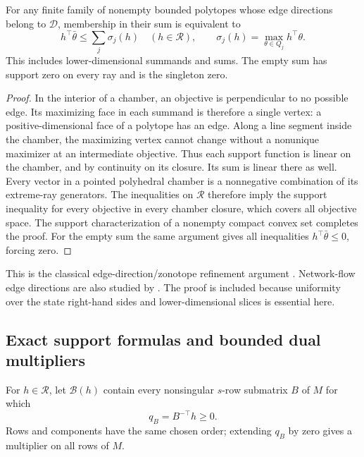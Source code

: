 \begin{lemma}\label{lem:rank-support-library}
For any finite family of nonempty bounded polytopes whose edge directions
belong to $\mathcal D$, membership in their sum is equivalent to
\begin{equation}\label{eq:rank-support-tests}
 h^\top\bar\theta\le\sum_j\sigma_j(h)\quad(h\in\mathcal R),\qquad
 \sigma_j(h)=\max_{\theta\in Q_j}h^\top\theta.
\end{equation}
This includes lower-dimensional summands and sums. The empty sum has
support zero on every ray and is the singleton zero.
\end{lemma}
\begin{proof}
In the interior of a chamber, an objective is perpendicular to no
possible edge. Its maximizing face in each summand is therefore a single
vertex: a positive-dimensional face of a polytope has an edge. Along
a line segment inside the chamber, the maximizing vertex cannot change
without a nonunique maximizer at an intermediate objective. Thus each
support function is linear on the chamber, and by continuity on its
closure. Its sum is linear there as well. Every vector in a pointed
polyhedral chamber is a nonnegative combination of its extreme-ray
generators. The inequalities on $\mathcal R$ therefore imply the support
inequality for every objective in every chamber closure, which covers
all objective space. The support characterization of a nonempty compact
convex set completes the proof. For the empty sum the same argument
gives all inequalities $h^\top\bar\theta\le0$, forcing zero.
\end{proof}

This is the classical edge-direction/zonotope refinement argument
\citep{GritzmannSturmfels1993,OnnRothblum2004,MelamedOnn2014}.
Network-flow edge directions are also studied by
\citet{OnnRothblumTangir2005}. The proof is included because uniformity
over the state right-hand sides and lower-dimensional slices is essential
here.

\subsection{Exact support formulas and bounded dual multipliers}\label{subsec:rank-duals}
For $h\in\mathcal R$, let $\mathcal B(h)$ contain every nonsingular
$s$-row submatrix $B$ of $M$ for which
\begin{equation}\label{eq:rank-dual-vector}
 q_B=B^{-\top}h\ge0.
\end{equation}
Rows and components have the same chosen order; extending $q_B$ by zero
gives a multiplier on all rows of $M$.

